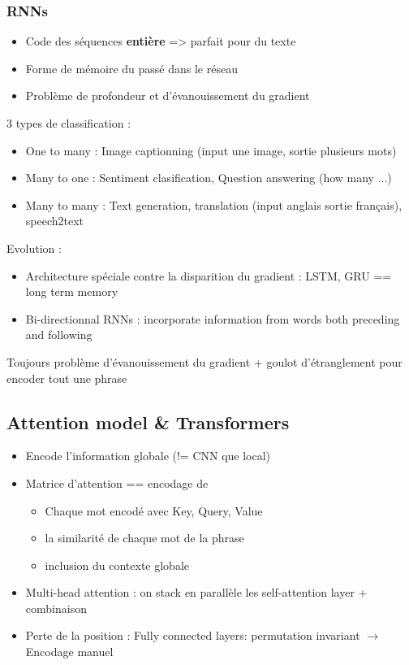 \documentclass{article}
\theoremstyle{plain}%
\theoremstyle{definition}
\theoremstyle{remark}
\begin{document}
\subsubsection{RNNs}
\begin{itemize}
    \item Code des séquences \textbf{entière} => parfait pour du texte
    \item Forme de mémoire du passé dans le réseau
    \item Problème de profondeur et d'évanouissement du gradient
\end{itemize}
3 types de classification :
\begin{itemize}
    \item One to many : Image captionning (input une image, sortie plusieurs mots)
    \item Many to one : Sentiment clasification, Question answering (how many ...)
    \item Many to many : Text generation, translation (input anglais sortie français), speech2text 
\end{itemize}
Evolution : 
\begin{itemize}
    \item Architecture spéciale contre la disparition du gradient : LSTM, GRU == long term memory 
    \item Bi-directionnal RNNs : incorporate information from words both preceding and following
\end{itemize}
Toujours problème d'évanouissement du gradient + goulot d'étranglement pour encoder tout une phrase

\subsection{Attention model \& Transformers }
\begin{itemize}
    \item Encode l'information globale (!= CNN que local)
    \item Matrice d'attention == encodage de \begin{itemize}
        \item Chaque mot encodé avec Key, Query, Value
        \item la similarité de chaque mot de la phrase
        \item inclusion du contexte globale
    \end{itemize} 
    \item Multi-head attention : on stack en parallèle les self-attention layer + combinaison
    \item Perte de la position : Fully connected layers: permutation invariant $\rightarrow$ Encodage manuel 
\end{itemize}
\end{document}
